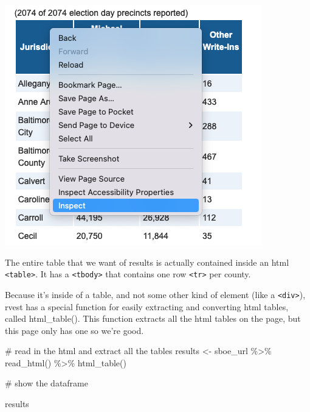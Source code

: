 \documentclass[
  letterpaper,
  DIV=11,
  numbers=noendperiod]{scrreprt}
\newenvironment{Shaded}{\begin{snugshade}}{\end{snugshade}}
\newcommand{\CommentTok}[1]{\textcolor[rgb]{0.37,0.37,0.37}{#1}}
\newcommand{\FunctionTok}[1]{\textcolor[rgb]{0.28,0.35,0.67}{#1}}
\newcommand{\NormalTok}[1]{\textcolor[rgb]{0.00,0.23,0.31}{#1}}
\newcommand{\OtherTok}[1]{\textcolor[rgb]{0.00,0.23,0.31}{#1}}
\newcommand{\SpecialCharTok}[1]{\textcolor[rgb]{0.37,0.37,0.37}{#1}}
\begin{document}
\includegraphics{./images/rvest4.png}

The entire table that we want of results is actually contained inside an
html \texttt{\textless{}table\textgreater{}}. It has a
\texttt{\textless{}tbody\textgreater{}} that contains one row
\texttt{\textless{}tr\textgreater{}} per county.

Because it's inside of a table, and not some other kind of element (like
a \texttt{\textless{}div\textgreater{}}), rvest has a special function
for easily extracting and converting html tables, called html\_table().
This function extracts all the html tables on the page, but this page
only has one so we're good.

\begin{Shaded}
\begin{Highlighting}[]
\CommentTok{\# read in the html and extract all the tables}
\NormalTok{results }\OtherTok{\textless{}{-}}\NormalTok{ sboe\_url }\SpecialCharTok{\%\textgreater{}\%}
  \FunctionTok{read\_html}\NormalTok{() }\SpecialCharTok{\%\textgreater{}\%}
  \FunctionTok{html\_table}\NormalTok{()}

\CommentTok{\# show the dataframe}

\NormalTok{results}
\end{Highlighting}
\end{Shaded}
\end{document}
